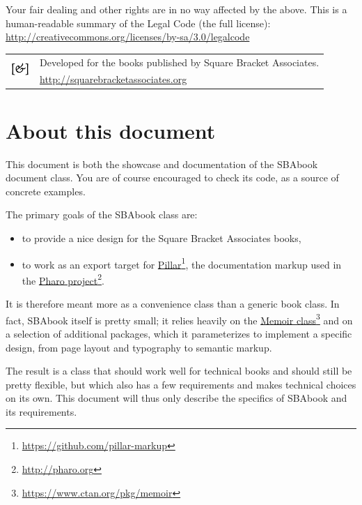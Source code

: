 \documentclass[twoside,openany,showtrims]{sbabook}
\newcommand\hrefnote[3][]{%
  \href{#2}{#3}\footnote{\url{#2} #1}}
\begin{document}
{  Your fair dealing and other rights are in no way affected by the
  above. This is a human-readable summary of the Legal Code (the full
  license): \\
  \url{http://creativecommons.org/licenses/by-sa/3.0/legalcode}

  \vfill

  \begin{tabular}{@{}c@{\quad}l}
    \multirow{2}{*}{\includegraphics[width=2em]{sba-logo.pdf}}
    & Developed for the books published by Square Bracket Associates. \\
    & \url{http://squarebracketassociates.org} \\[\smallskipamount]
  \end{tabular}
}


\frontmatter
\pagestyle{plain}

\chapter*{About this document}

This document is both the showcase and documentation of the SBAbook document
class.
You are of course encouraged to check its code, as a source of concrete examples.

The primary goals of the SBAbook class are:
\begin{itemize}
\item to provide a nice design for the Square Bracket Associates books,
\item to work as an export target for
  \hrefnote{https://github.com/pillar-markup}{Pillar}, the documentation markup
  used in the \hrefnote{http://pharo.org}{Pharo project}.
\end{itemize}
It is therefore meant more as a convenience class than a generic book class.
In fact, SBAbook itself is pretty small; it relies heavily on the
\hrefnote{https://www.ctan.org/pkg/memoir}{Memoir class} and on a selection of
additional packages, which it parameterizes to implement a specific design, from
page layout and typography to semantic markup.

The result is a class that should work well for technical books and should still
be pretty flexible, but which also has a few requirements and makes technical
choices on its own.
This document will thus only describe the specifics of SBAbook and its requirements.
\end{document}
